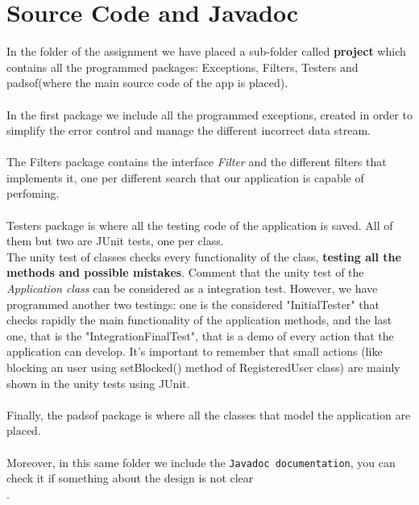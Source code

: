 \documentclass[12pt]{article}
\begin{document}
\section{Source Code and Javadoc}
In the folder of the assignment we have placed a sub-folder called \textbf{project} which contains all the programmed packages: Exceptions, Filters, Testers and padsof(where the main source code of the app is placed).\\\\
In the first package we include all the programmed exceptions, created in order to simplify the error control and manage the different incorrect data stream.\\\\
The Filters package contains the interface \emph{Filter} and the different filters that implements it, one per different search that our application is capable of perfoming.\\\\
Testers package is where all the testing code of the application is saved. All of them but two are JUnit tests, one per class.\\ The unity test of classes checks every functionality of the class, \textbf{testing all the methods and possible mistakes}. Comment that the unity test of the  \emph{Application class} can be considered as a integration test. However, we have programmed another two testings: one is the considered "InitialTester" that checks rapidly the main functionality of the application methods, and the last one, that is the "IntegrationFinalTest", that is a demo of every action that the application can develop. It's important to remember that small actions (like blocking an user using setBlocked() method of RegisteredUser class) are mainly shown in the unity tests using JUnit.\\\\
Finally, the padsof package is where all the classes that model the application are placed.\\\\
Moreover, in this same folder we include the \texttt{Javadoc documentation}, you can check it if something about the design is not clear\\.
	
\end{document}
